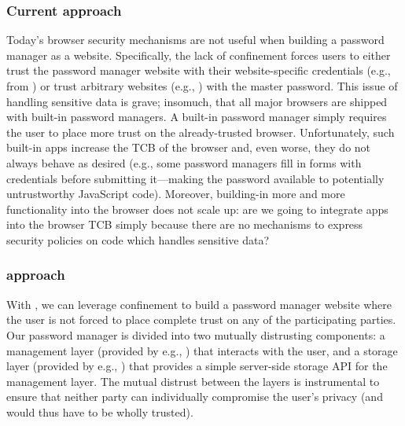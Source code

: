 \subsubsection{Current approach}
%
Today's browser security mechanisms are not useful when building a
password manager as a website.
%
Specifically, the lack of confinement forces users to either trust the
password manager website with their website-specific  credentials 
(e.g., from 
) or trust arbitrary websites (e.g.,
) with the master password.
%
This issue of handling sensitive data is grave; insomuch, that all
major browsers are shipped with built-in password managers.
%
A built-in password manager simply requires the user to place more
trust on the already-trusted browser.
%
Unfortunately, such built-in apps increase the TCB of the browser and, even
worse, they do not always behave as desired (e.g., some password managers fill in
forms with credentials before submitting it---making the
password available to potentially untrustworthy JavaScript code).
%
Moreover, building-in more and more functionality into the browser does not
scale up: are we going to integrate apps into the browser TCB simply because
there are no mechanisms 
to express security policies on code which handles sensitive data?

\subsubsection{\sys{} approach}
%
With \sys{}, we can leverage confinement to build a password manager
website where the user is not forced to place complete trust on 
any of the participating parties.
%
Our password manager is divided into two mutually distrusting
components: a management layer (provided by e.g., )
that interacts with the user, 
and a storage layer (provided by e.g., ) that provides a
simple
server-side storage API for the
management layer.
%
The mutual distrust between the layers is instrumental to ensure
that neither party can individually compromise the user's privacy (and
would thus have to be wholly trusted).
%

